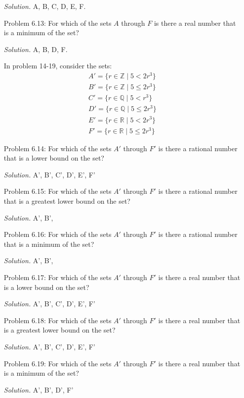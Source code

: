 \documentclass{article}
\theoremstyle{claim}
\theoremstyle{definition}
\begin{document}
\begin{enumerate}
    \item[] \emph{Solution. } A, B, C, D, E, F. 
    \item[Problem 6.13:] For which of the sets $A$ through $F$ is there a real number that is a minimum of the set?
    \item[] \emph{Solution. } A, B, D, F.
    \item[] In problem 14-19, consider the sets:
    \begin{gather*}
        A' = \{ r \in \mathbb{Z} \mid 5 < 2r^3\}\\
        B' = \{ r \in \mathbb{Z} \mid 5 \le 2r^3\}\\
        C' = \{ r \in \mathbb{Q} \mid 5 < r^3\}\\
        D' = \{ r \in \mathbb{Q} \mid 5 \le 2r^3\}\\
        E' = \{ r \in \mathbb{R} \mid 5 < 2r^3\}\\
        F' = \{ r \in \mathbb{R} \mid 5 \le 2r^3\}
    \end{gather*}
    \item[Problem 6.14:] For which of the sets $A'$ through $F'$ is there a rational number that is a lower bound on the set?
    \item[] \emph{Solution.} A', B', C', D', E', F'
    \item[Problem 6.15:] For which of the sets $A'$ through $F'$ is there a rational number that is a greatest lower bound on the set?
    \item[] \emph{Solution.} A', B',
    \item[Problem 6.16:] For which of the sets $A'$ through $F'$ is there a rational number that is a minimum of the set?
    \item[] \emph{Solution.} A', B',
    \item[Problem 6.17:] For which of the sets $A'$ through $F'$ is there a real number that is a lower bound on the set?
    \item[] \emph{Solution.} A', B', C', D', E', F'
    \item[Problem 6.18:] For which of the sets $A'$ through $F'$ is there a real number that is a greatest lower bound on the set?
    \item[] \emph{Solution.} A', B', C', D', E', F'
    \item[Problem 6.19:] For which of the sets $A'$ through $F'$ is there a real number that is a minimum of the set?
    \item[] \emph{Solution.} A', B', D', F'
\end{enumerate}
\end{document}
